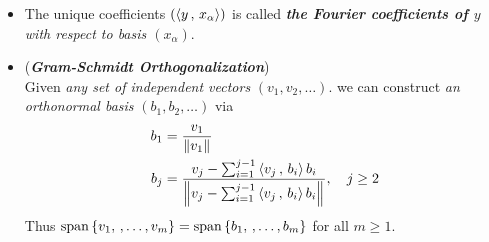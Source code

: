 \documentclass[11pt]{article}
\begin{document}
\begin{itemize}
\item \begin{remark}
The unique coefficients $(\left\langle y\,,\, x_{\alpha} \right\rangle)$ is called \emph{\textbf{the Fourier coefficients of $y$} with respect to basis $(x_{\alpha})$}.
\end{remark}

\item \begin{remark} (\emph{\textbf{Gram-Schmidt Orthogonalization}})\\
Given \emph{any set of independent vectors} $(v_1, v_2, \ldots)$. we can construct \emph{an orthonormal basis} $(b_1, b_2, \ldots)$ via
\begin{align*}
b_1 &= \frac{v_1}{\left\|v_1\right\|_{}}\\
b_j &= \frac{v_j - \sum_{i=1}^{j-1}\left\langle v_j\,,\, b_i \right\rangle b_i}{\left\|v_j - \sum_{i=1}^{j-1}\left\langle v_j\,,\, b_i \right\rangle b_i\right\|_{}}, \quad j\ge 2
\end{align*} Thus $\text{span}\left\{v_1, \,{,}\ldots{,}\, v_m\right\} = \text{span}\left\{b_1, \,{,}\ldots{,}\, b_m\right\}$ for all $m \ge 1$.
\end{remark}
\end{itemize}
\end{document}
